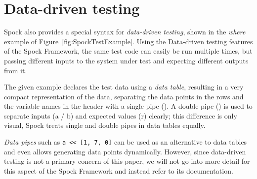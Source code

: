 \section{Data-driven testing}
Spock also provides a special syntax for \textit{data-driven testing},
shown in the \textit{where} example of Figure~\ref{fig:SpockTestExample}.
Using the Data-driven testing features of the Spock Framework,
the same test code can easily be run multiple times,
but passing different inputs to the system under test
and expecting different outputs from it.
\autocite{SpockFrameworkDoc}

The given example declares the test data using a \textit{data table},
resulting in a very compact representation of the data,
separating the data points in the rows
and the variable names in the header
with a single pipe (\code{|}).
A double pipe (\code{||}) is used to separate
inputs (a / b) and expected values (r) clearly;
this difference is only visual,
Spock treats single and double pipes in data tables equally.
\autocite{SpockFrameworkDoc}

\textit{Data pipes} such as \texttt{a << [1, 7, 0]}
can be used as an alternative to data tables and even
allows generating data points dynamically.
However, since data-driven testing is not a primary concern of this paper,
we will not go into more detail for this aspect of the Spock Framework
and instead refer to its documentation.
\autocite{SpockFrameworkDoc}
